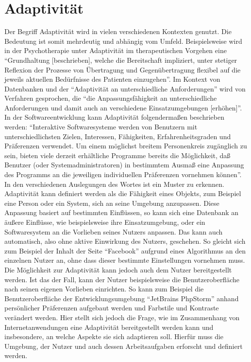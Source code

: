 \documentclass[12pt, paper=a4, bibtotoc, toc=listof, headsepline=true]{scrreprt}
\begin{document}
\chapter{Adaptivität}
Der Begriff Adaptivität wird in vielen verschiedenen Kontexten genutzt. Die Bedeutung ist somit mehrdeutig und abhängig vom Umfeld. Beispielsweise wird in der Psychotherapie unter Adaptivität im therapeutischen Vorgehen eine \enquote{Grundhaltung [beschrieben], welche die Bereitschaft impliziert, unter stetiger Reflexion der Prozesse von Übertragung und Gegenübertragung flexibel auf die jeweils aktuellen Bedürfnisse des Patienten einzugehen}\cite[S. 45]{woeller2014tiefenpsychologisch}. Im Kontext von Datenbanken und der \enquote{Adaptivität an unterschiedliche Anforderungen} wird von Verfahren gesprochen, die \enquote{die Anpassungsfähigkeit an unterschiedliche Anforderungen und damit auch an verschiedene Einsatzumgebungen [erhöhen]}\cite[][S. 112]{loeser2013web}.
In der Softwareentwicklung kann Adaptivität folgendermaßen beschrieben werden: \enquote{Interaktive Softwaresysteme werden von Benutzern mit unterschiedlichsten Zielen, Interessen, Fähigkeiten, Erfahrenheitsgraden und Präferenzen verwendet. Um einem möglichst breitem Personenkreis zugänglich zu sein, bieten viele derzeit erhältliche Programme bereits die Möglichkeit, daß Benutzer (oder Systemadministratoren) in bestimmtem Ausmaß eine Anpassung des Programms an die jeweiligen individuellen Präferenzen vornehmen können}\cite[S. 1]{Kobsa1993}.
\newline In den verschiedenen Auslegungen des Wortes ist ein Muster zu erkennen. Adaptivität kann definiert werden als die Fähigkeit eines Objekts, zum Beispiel eine Person oder ein System, sich an seine Umgebung anzupassen. Diese Anpassung basiert auf bestimmten Einflüssen, so kann sich eine Datenbank an äußere Einflüsse, wie beispielsweise ihre Einsatzumgebung, oder ein Softwaresystem an die Vorlieben seines Nutzers anpassen. Das kann auch automatisch, also ohne aktive Einwirkung des Nutzers, geschehen. So gleicht sich zum Beispiel der Inhalt der Seite \enquote{Facebook} aufgrund eines Algorithmus an den einzelnen Nutzer an, ohne dass dieser bestimmte Einstellungen vornehmen muss\cite{Rixecker2016}. Die Möglichkeit zur Adaptivität kann jedoch auch dem Nutzer bereitgestellt werden. Ist das der Fall, kann der Nutzer beispielsweise die Benutzeroberfläche nach seinen eigenen Vorlieben einrichten. So kann zum Beispiel die Benutzeroberfläche der Entwicklungsumgebung \enquote{JetBrains PhpStorm} anhand persönlicher Präferenzen aufgebaut werden und Farbstile und Kontraste verändert werden.
\newline Hier stellt sich jedoch die Frage, wie im Zusammenhang von Internetanwendungen eine Adaptivität bereitgestellt werden kann und insbesondere, an welche Aspekte sie sich adaptieren soll. Hierfür muss die Umgebung, der Nutzer und auch dessen Arbeitsaufgaben erforscht und definiert werden.
\end{document}
